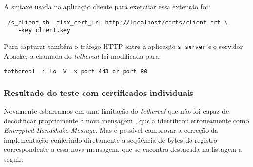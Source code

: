 A sintaxe usada na aplicação cliente para exercitar essa extensão foi:

\begin{lstlisting}[caption={Chamada da \texttt{s\_client.sh} para teste da extensão \acs{CCU}}]
./s_client.sh -tlsx_cert_url http://localhost/certs/client.crt \
    -key client.key
\end{lstlisting}

Para capturar também o tráfego \acs{HTTP} entre a aplicação \verb|s_server| e o servidor 
Apache, a chamada do \emph{tethereal} foi modificada para:

\begin{lstlisting}[caption={Chamada do \texttt{tethereal} para capturar tráfegos TLS e HTTP}]
tethereal -i lo -V -x port 443 or port 80
\end{lstlisting}

\subsubsection{Resultado do teste com certificados individuais}

Novamente esbarramos em uma limitação do \emph{tethereal} que não foi capaz de 
decodificar propriamente a nova mensagem \tlsHsCu, que a identificou 
erroneamente como \emph{Encrypted Handshake Message}. Mas é possível comprovar a 
correção da implementação conferindo diretamente a seqüência de bytes do 
registro correspondente a essa nova mensagem, que se encontra destacada na 
listagem a seguir:

